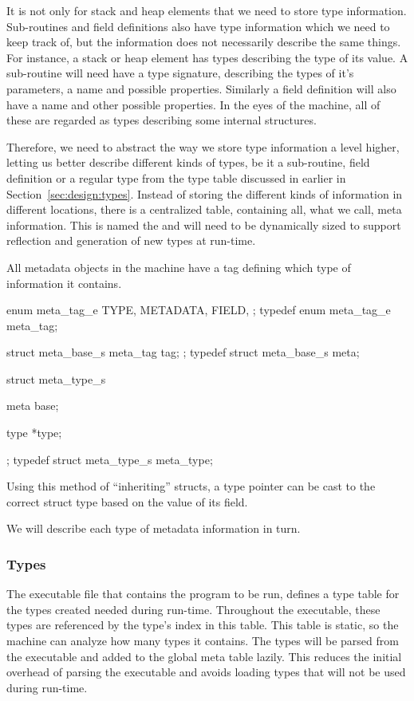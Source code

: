 It is not only for stack and heap elements that we need to store type
information. Sub-routines and field definitions also have type information which
we need to keep track of, but the information does not necessarily describe the
same things. For instance, a stack or heap element has types describing the type
of its value. A sub-routine will need have a type signature, describing the
types of it's parameters, a name and possible properties. Similarly a field
definition will also have a name and other possible properties. In the eyes of
the machine, all of these are regarded as types describing some internal
structures.

Therefore, we need to abstract the way we store type information a level higher,
letting us better describe different kinds of types, be it a sub-routine, field
definition or a regular type from the type table discussed in earlier in
Section~\ref{sec:design:types}. Instead of storing the different kinds of
information in different locations, there is a centralized table, containing
all, what we call, meta information. This is named the  and
will need to be dynamically sized to support reflection and generation of new
types at run-time.

All metadata objects in the machine have a tag defining which type of
information it contains.

\begin{ccode}
enum meta_tag_e {
    TYPE,
    METADATA,
    FIELD,
};
typedef enum meta_tag_e meta_tag;

struct meta_base_s {
    meta_tag tag;
};
typedef struct meta_base_s meta;

struct meta_type_s {
    meta base;

    type *type;
};
typedef struct meta_type_s meta_type;
\end{ccode}

Using this method of ``inheriting'' structs, a type pointer can be cast to the
correct struct type based on the value of its  field.

We will describe each type of metadata information in turn.

\subsubsection{Types}
\label{sec:implementation:meta:types}

The executable file that contains the program to be run, defines a type table
for the types created needed during run-time. Throughout the executable, these
types are referenced by the type's index in this table. This table is static, so
the machine can analyze how many types it contains. The types will be parsed
from the executable and added to the global meta table lazily. This reduces the
initial overhead of parsing the executable and avoids loading types that will
not be used during run-time.

